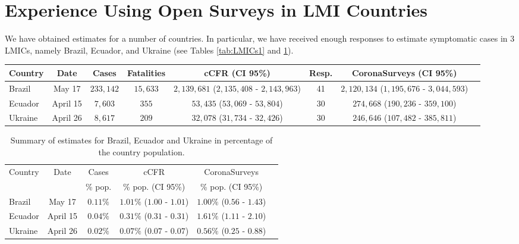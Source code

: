\documentclass[sigconf]{acmart}
\begin{document}
\section{Experience Using Open Surveys in LMI Countries}

We have obtained estimates for a number of countries. In particular, we have received enough responses to estimate symptomatic cases in 3 LMICs, namely Brazil, Ecuador, and Ukraine (see Tables \ref{tab:LMICs1} and \ref{tab:LMICs2}). 

\begin{table*}
    \centering
    \small
    \begin{tabular}{|l|c|c|c|c|c|c|c|}
    \hline
 Country    &  Date       & Cases & Fatalities & cCFR (CI 95\%) & Resp. & CoronaSurveys (CI 95\%) \\ 
 \hline
  Brazil     & May 17 & $233,142$ & $15,633$ & $2,139,681$ ($2,135,408$ - $2,143,963$) & 41  & $2,120,134$ ($1,195,676$ - $3,044,593$) \\
  Ecuador    & April 15 & $7,603$ & $355$ & $53,435$ ($53,069$ - $53,804$) & 30  & $274,668$ ($190,236$ - $359,100$)  \\
   Ukraine    & April 26 & $8,617$ & $209$ & $32,078$ ($31,734$ - $32,426$) & 30  & $246,646$ ($107,482$ - $385,811$)  \\ \hline
    \end{tabular}
    \caption{Summary of estimates for Brazil, Ecuador and Ukraine. Cases and Fatalities correspond to the official data on that day, while cCFR and CoronaSurveys are estimates. }
    \label{tab:LMICs1}
\end{table*}

\begin{table}[t!]
    \centering
    \small
    \begin{tabular}{|l|c|c|c|c|c|}
    \hline
 Country    &  Date       & Cases & cCFR & CoronaSurveys \\  
            &             &   \% pop.    & \% pop. (CI 95\%)  & \% pop. (CI 95\%)  \\
 \hline
  Brazil     & May 17 & $0.11\%$ & $1.01\%$  ($1.00$ - $1.01$) & $1.00\%$ ($0.56$ - $1.43$)  \\
  Ecuador    & April 15 & $0.04\%$ & $0.31\%$  ($0.31$ - $0.31$) & $1.61\%$ ($1.11$ - $2.10$)  \\
   Ukraine    & April 26 & $0.02\%$ & $0.07\%$  ($0.07$ - $0.07$) & $0.56\%$ ($0.25$ - $0.88$)  \\ \hline
    \end{tabular}
    \caption{Summary of estimates for Brazil, Ecuador and Ukraine in percentage of the country population.} 
    \label{tab:LMICs2}
\end{table}
\end{document}
